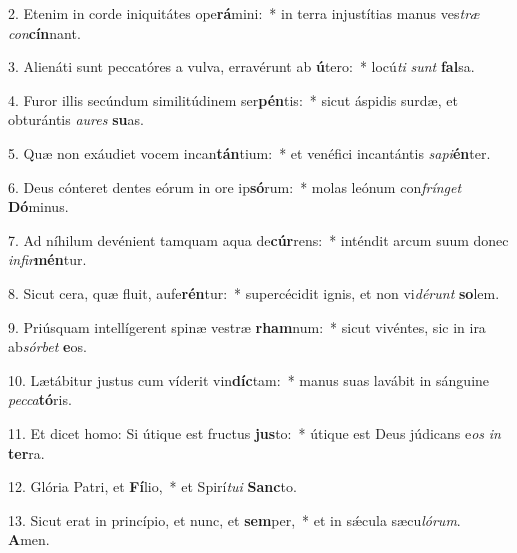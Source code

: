 2. Etenim in corde iniquitátes ope\textbf{rá}mini:~*  in terra injustítias manus ves\textit{træ} \textit{con}\textbf{cín}nant.\

3. Alienáti sunt peccatóres a vulva, erravérunt ab \textbf{ú}tero:~*  locú\textit{ti} \textit{sunt} \textbf{fal}sa.\

4. Furor illis secúndum similitúdinem ser\textbf{pén}tis:~*  sicut áspidis surdæ, et obturántis \textit{au}\textit{res} \textbf{su}as.\

5. Quæ non exáudiet vocem incan\textbf{tán}tium:~*  et venéfici incantántis \textit{sa}\textit{pi}\textbf{én}ter.\

6. Deus cónteret dentes eórum in ore ip\textbf{só}rum:~*  molas leónum con\textit{frín}\textit{get} \textbf{Dó}minus.\

7. Ad níhilum devénient tamquam aqua de\textbf{cúr}rens:~*  inténdit arcum suum donec \textit{in}\textit{fir}\textbf{mén}tur.\

8. Sicut cera, quæ fluit, aufe\textbf{rén}tur:~*  supercécidit ignis, et non vi\textit{dé}\textit{runt} \textbf{so}lem.\

9. Priúsquam intellígerent spinæ vestræ \textbf{rham}num:~*  sicut vivéntes, sic in ira ab\textit{sór}\textit{bet} \textbf{e}os.\

10. Lætábitur justus cum víderit vin\textbf{díc}tam:~*  manus suas lavábit in sánguine \textit{pec}\textit{ca}\textbf{tó}ris.\

11. Et dicet homo: Si útique est fructus \textbf{jus}to:~*  útique est Deus júdicans e\textit{os} \textit{in} \textbf{ter}ra.\

12. Glória Patri, et \textbf{Fí}lio,~*  et Spirí\textit{tu}\textit{i} \textbf{Sanc}to.\

13. Sicut erat in princípio, et nunc, et \textbf{sem}per,~*  et in sǽcula sæcu\textit{ló}\textit{rum}. \textbf{A}men.\

